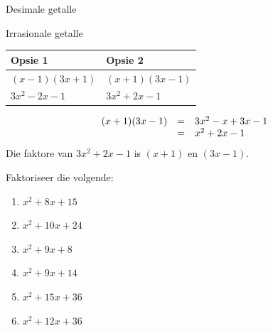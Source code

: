 \begin{Aktiwiteit}{Desimale getalle}
\begin{aktiwiteit}{Irrasionale getalle}
\begin{wex}
{\begin{table}[H]
\begin{center}
\label{m39394*id277097}
\noindent

\begin{tabular}{|l|l|}\hline
Opsie 1 &
Opsie 2%
\\ \hline
$(x-1)(3x+1)$
&
$(x+1)(3x-1)$
\\ \hline
$3{x}^{2}-2x-1$
&
\uline{
$3{x}^{2}+2x-1$
}
\\ \hline
\end{tabular}
\end{center}
\end{table}

\begin{equation*}
\begin{array}{ccl}  
(x+1)(3x-1)& =& 3{x}^{2}-x+3x-1\hfill \\ & =& {x}^{2}+2x-1\end{array}
\end{equation*}
\westep{}
Die faktore van $3{x}^{2}+2x-1$ is $(x+1)$ en $(3x-1)$.

}
\end{wex}


\begin{exercises}{}
{
Faktoriseer die volgende:
\begin{multicols}{2}
\begin{enumerate}[itemsep=5pt, label=\textbf{\arabic*}. ] 
\item ${x}^{2}+8x+15$
\item ${x}^{2}+10x+24$
\item ${x}^{2}+9x+8$
\item ${x}^{2}+9x+14$
\item ${x}^{2}+15x+36$
\item ${x}^{2}+12x+36$
\end{enumerate}
\end{multicols}


}
\end{exercises}
\end{aktiwiteit}
\end{Aktiwiteit}

